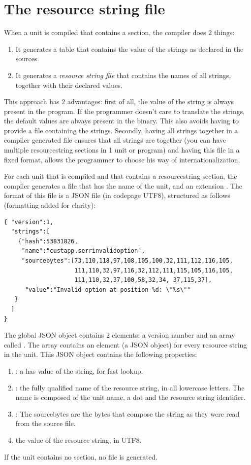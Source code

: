 \section{The resource string file}
When a unit is compiled that contains a  section,
the compiler does 2 things:
\begin{enumerate}
\item It generates a table that contains the value of the strings as declared in the sources.
\item It generates a {\em resource string file} that contains the names
of all strings, together with their declared values.
\end{enumerate}
This approach has 2 advantages: first of all, the value of the string is
always present in the program. If the programmer doesn't care to translate
the strings, the default values are always present in the binary. This also
avoids having to provide a file containing the strings. Secondly, having all
strings together in a compiler generated file ensures that all strings are
together (you can have multiple resourcestring sections in 1 unit or program)
and having this file in a fixed format, allows the programmer to choose his
way of internationalization.

For each unit that is compiled and that contains a resourcestring section,
the compiler generates a file that has the name of the unit, and an
extension . The format of this file is a JSON file (in codepage UTF8), 
structured as follows (formatting added for clarity):
\begin{verbatim}
{ "version":1,
  "strings":[
    {"hash":53831826,
     "name":"custapp.serrinvalidoption",
     "sourcebytes":[73,110,118,97,108,105,100,32,111,112,116,105,
                    111,110,32,97,116,32,112,111,115,105,116,105,
                    111,110,32,37,100,58,32,34, 37,115,37],
      "value":"Invalid option at position %d: \"%s\""
   }
  ]
}
\end{verbatim}
The global JSON  object contains 2 elements: a version number and an array
called . The array contains an element (a JSON object) for every resource string in the
unit. This JSON object contains the following properties:
\begin{enumerate}
\item {}: a has value of the string, for fast lookup.
\item {}: the fully qualified name of the resource string, in all lowercase letters. 
The name is composed of the unit name, a dot and the resource string
identifier.
\item {}: The sourcebytes are the bytes that compose the string as they
were read from the source file.
\item {} the value of the resource string, in UTF8.
\end{enumerate}
If the unit contains no  section, no file is generated.


